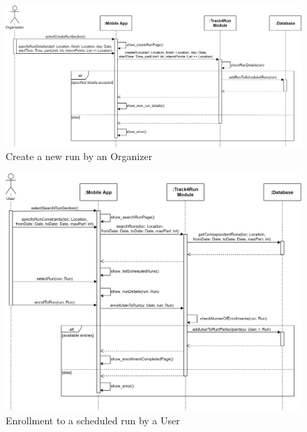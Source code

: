 
\begin{figure}[H]
    \centering
    \includegraphics[scale=0.16]{DD/Pictures/createRunSeqDiagDD.png}
    \caption{Create a new run by an Organizer}
\end{figure}

\begin{figure}[H]
    \centering
    \includegraphics[scale=0.18]{DD/Pictures/enrollSeqDiagDD.png}
    \caption{Enrollment to a scheduled run by a User}
\end{figure}